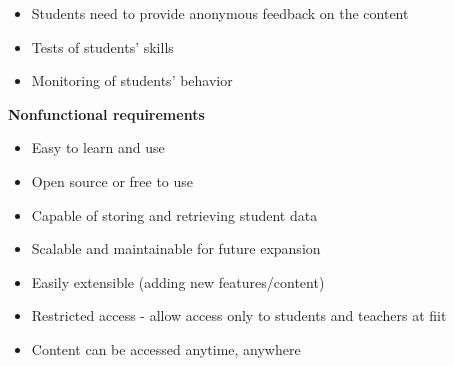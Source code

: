 \begin{itemize}
\begin{itemize}
        \end{itemize}
    \item Students need to provide anonymous feedback on the content
    \item Tests of students' skills
    \item Monitoring of students' behavior
\end{itemize}




\textbf{Nonfunctional requirements}

\begin{itemize}
    \item Easy to learn and use
    \item Open source or free to use
    \item Capable of storing and retrieving student data
    \item Scalable and maintainable for future expansion
    \item Easily extensible (adding new features/content)
    \item Restricted access - allow access only to students and teachers at \ac{fiit}
    \item Content can be accessed anytime, anywhere
\end{itemize}




